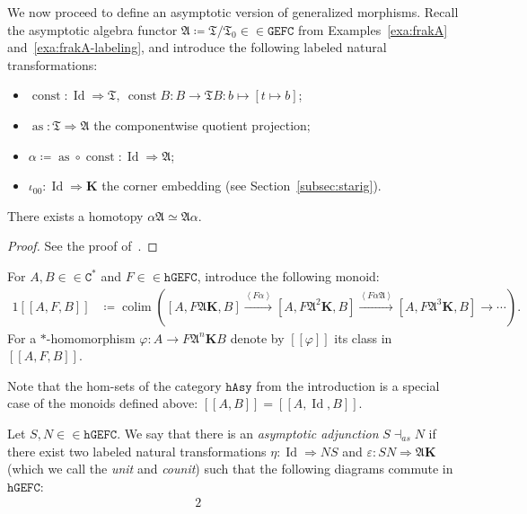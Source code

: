 \documentclass[10pt]{simplearticle}
\newcommand{\tikzinput}[1]{}
\newcommand{\as}{\operatorname{as}}
\newcommand{\const}{\operatorname{const}}
\newcommand{\colim}{\operatorname*{colim}}
\newcommand{\Id}{\operatorname{Id}}
\newcommand{\GEFC}{\mathbb{\mathtt{GEFC}}}
\newcommand{\hGEFC}{\mathtt{hGEFC}}
\newcommand{\Cstar}{\mathtt{C^{*}}}
\newcommand{\hAsy}{\mathtt{hAsy}}
\newcommand{\asadj}{\dashv_{as}}
\newcommand{\fK}{\mathbf{K}}
\newcommand{\myllbracket}{[[}
\newcommand{\myrrbracket}{]]}
\newcommand{\bbrackets}[1]{\myllbracket#1\myrrbracket}
\begin{document}
We now proceed to define an asymptotic version of generalized morphisms.
Recall
the asymptotic algebra functor $\mathfrak{A}\coloneqq\mathfrak{T}/\mathfrak{T}_{0}\in\in\GEFC$
from Examples~\ref{exa:frakA} and~\ref{exa:frakA-labeling}, and
introduce the following labeled natural transformations:
\begin{itemize}
\item $\const\colon\Id\Rightarrow\mathfrak{T},~\const B\colon B\to\mathfrak{T}B\colon b\mapsto[t\mapsto b]$;
\item $\as\colon\mathfrak{T}\Rightarrow\mathfrak{A}$ the componentwise
quotient projection;
\item $\alpha\coloneqq\as\circ\const\colon\Id\Rightarrow\mathfrak{A}$;
\item $\iota_{00}\colon\Id\Rightarrow\fK$ the corner embedding (see Section~\ref{subsec:starig}).
\end{itemize}
\begin{lem}\label{lem:alpha-A}
 There exists a homotopy $\alpha\mathfrak{A}\simeq\mathfrak{A}\alpha$.
\end{lem}

\begin{proof}
See the proof of~\cite[Proposition~2.8]{GHT}.
\end{proof}

\begin{defn}
For
$A,B\in\in\Cstar$ and $F\in\in\hGEFC$, introduce
the following monoid:
\begin{alignat*}{1}
\bbrackets{A,F,B} & \coloneqq\colim\left([A,F\mathfrak{A}\fK,B]\xrightarrow{\left\langle F\alpha\right\rangle }[A,F\mathfrak{A}^{2}\fK,B]\xrightarrow{\left\langle F\alpha\mathfrak{A}\right\rangle }[A,F\mathfrak{A}^{3}\fK,B]\to\cdots\right).
\end{alignat*}
For a $*$-homomorphism $\varphi\colon A\to F\mathfrak{A}^{n}\fK B$
denote by $\bbrackets{\varphi}$ its class in $\bbrackets{A,F,B}$.
\end{defn}

\begin{rem}
Note that the hom-sets of the category $\hAsy$ from the introduction
is a special case of the monoids defined above: $\bbrackets{A,B}=\bbrackets{A,\Id,B}$.
\end{rem}

\begin{defn}\label{def:asadj}
Let
$S,N\in\in\hGEFC$. We say
that there is an \emph{asymptotic adjunction} $S\asadj N$ if there
exist two labeled natural transformations $\eta\colon\Id\Rightarrow NS$
and $\varepsilon\colon SN\Rightarrow\mathfrak{A}\fK$ (which we call
the \emph{unit} and \emph{counit}) such that the following diagrams
commute in~$\hGEFC$:
\begin{alignat*}{2}
\tikzinput{d202} & \qquad\qquad & \tikzinput{d203}
\end{alignat*}
\end{defn}
\end{document}
